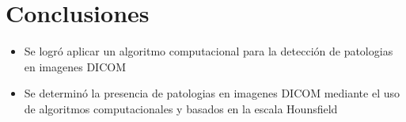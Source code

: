 \documentclass{article}
\begin{document}
	\section{Conclusiones}
	\begin{itemize}
		\item Se logró aplicar  un algoritmo computacional para la detección de patologias en imagenes DICOM
		\item Se determinó la presencia de patologias en imagenes DICOM mediante el uso de algoritmos computacionales y basados en la escala Hounsfield
		\end{itemize}
	
\end{document}
